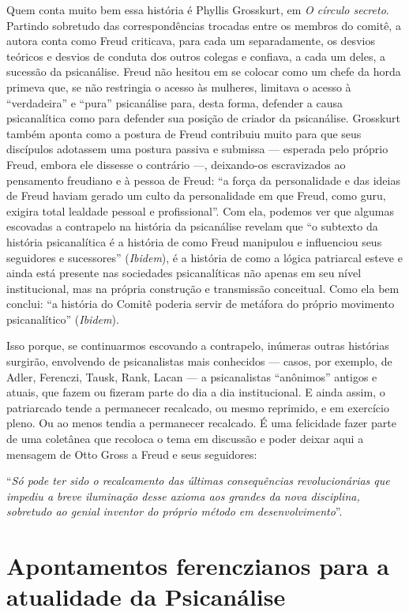 Quem conta muito bem essa história é Phyllis Grosskurt, em \emph{O
círculo secreto}. Partindo sobretudo das correspondências trocadas
entre os membros do comitê, a autora conta como Freud criticava, para
cada um separadamente, os desvios teóricos e desvios de conduta dos
outros colegas e confiava, a cada um deles, a sucessão da psicanálise.
Freud não hesitou em se colocar como um chefe da horda primeva que, se
não restringia o acesso às mulheres, limitava o acesso à ``verdadeira''
e ``pura'' psicanálise para, desta forma, defender a causa psicanalítica
como para defender sua posição de criador da psicanálise. Grosskurt
também aponta como a postura de Freud contribuiu muito para que seus
discípulos adotassem uma postura passiva e submissa --- esperada pelo
próprio Freud, embora ele dissesse o contrário ---, deixando-os
escravizados ao pensamento freudiano e à pessoa de Freud: ``a força da
personalidade e das ideias de Freud haviam gerado um culto da
personalidade em que Freud, como guru, exigira total lealdade pessoal e
profissional''. Com ela, podemos ver que algumas escovadas a contrapelo
na história da psicanálise revelam que ``o subtexto da história
psicanalítica é a história de como Freud manipulou e influenciou seus
seguidores e sucessores'' (\emph{Ibidem}), é a história de como a lógica
patriarcal esteve e ainda está presente nas sociedades psicanalíticas
não apenas em seu nível institucional, mas na própria construção e
transmissão conceitual. Como ela bem conclui: ``a história do Comitê
poderia servir de metáfora do próprio movimento psicanalítico''
(\emph{Ibidem}).

Isso porque, se continuarmos escovando a contrapelo, inúmeras outras
histórias surgirão, envolvendo de psicanalistas mais conhecidos ---
casos, por exemplo, de Adler, Ferenczi, Tausk, Rank, Lacan --- a
psicanalistas ``anônimos'' antigos e atuais, que fazem ou fizeram parte
do dia a dia institucional. E ainda assim, o patriarcado tende a
permanecer recalcado, ou mesmo reprimido, e em exercício pleno. Ou ao
menos tendia a permanecer recalcado. É uma felicidade fazer parte de uma
coletânea que recoloca o tema em discussão e poder deixar aqui a
mensagem de Otto Gross a Freud e seus seguidores:

``\emph{Só pode ter sido o recalcamento das últimas consequências
revolucionárias que impediu a breve iluminação desse axioma aos grandes
da nova disciplina, sobretudo ao genial inventor do próprio método em
desenvolvimento}''.

\chapter*{Apontamentos ferenczianos para a atualidade da Psicanálise}

